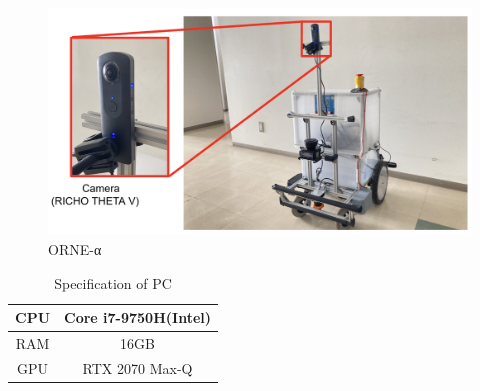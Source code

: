 \documentclass[../main]{subfiles}
\begin{document}
        \begin{figure}[H]
        \centering
        \includegraphics[width=13cm]{../images/experimental_machine3.png}
        \caption{ORNE-α}
        \label{figure::robot_image}
        \end{figure}

        \begin{table}[H]
         \centering
         \caption{Specification of PC}
         \begin{tabular}{l|l} \hline
         \multicolumn{1}{c|}{CPU} & \multicolumn{1}{c}{Core i7-9750H(Intel)} \\ \hline
         \multicolumn{1}{c|}{RAM} & \multicolumn{1}{c}{16GB} \\ \hline
         \multicolumn{1}{c|}{GPU} & \multicolumn{1}{c}{RTX 2070 Max-Q} \\ \hline
         \end{tabular}
         \label{table::pc_spec}
        \end{table}
\end{document}
